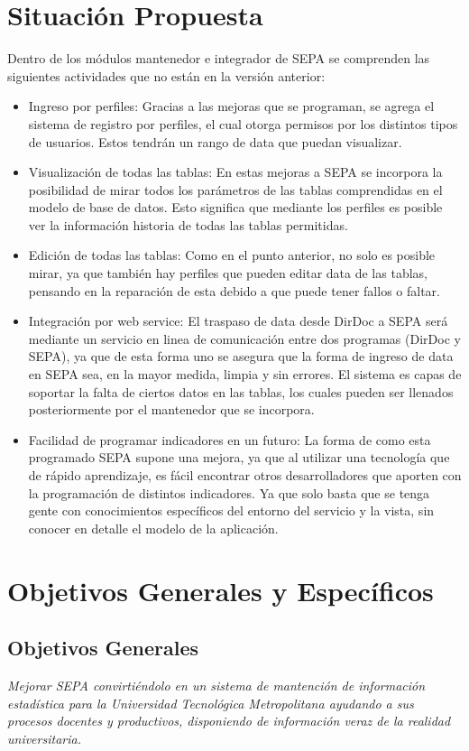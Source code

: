 \documentclass[a4paper,12pt,openany,oneside]{book}
\begin{document}
\section{Situación Propuesta}
Dentro de los módulos mantenedor e integrador de SEPA se comprenden las siguientes actividades que no están en la versión anterior:

\begin{itemize}
	\item Ingreso por perfiles: Gracias a las mejoras que se programan, se agrega el sistema de registro por perfiles, el cual otorga permisos por los distintos tipos de usuarios. Estos tendrán un rango de data que puedan visualizar. 
	\item Visualización de todas las tablas: En estas mejoras a SEPA se incorpora la posibilidad de mirar todos los parámetros de las tablas comprendidas en el modelo de base de datos. Esto significa que mediante los perfiles es posible ver la información historia de todas las tablas permitidas.
	\item Edición de todas las tablas: Como en el punto anterior, no solo es posible mirar, ya que también hay perfiles que pueden editar data de las tablas, pensando en la reparación de esta debido a que puede tener fallos o faltar.
	\item Integración por web service: El traspaso de data desde DirDoc a SEPA será mediante un servicio en linea de comunicación entre dos programas (DirDoc y SEPA), ya que de esta forma uno se asegura que la forma de ingreso de data en SEPA sea, en la mayor medida, limpia y sin errores. El sistema es capas de soportar la falta de ciertos datos en las tablas, los cuales pueden ser llenados posteriormente por el mantenedor que se incorpora.
	\item Facilidad de programar indicadores en un futuro: La forma de como esta programado SEPA supone una mejora, ya que al utilizar una tecnología que de rápido aprendizaje, es fácil encontrar otros desarrolladores que aporten con la programación de distintos indicadores. Ya que solo basta que se tenga gente con conocimientos específicos del entorno del servicio y la vista, sin conocer en detalle el modelo de la aplicación.
\end{itemize}
\section{Objetivos Generales y Específicos}
\subsection{Objetivos Generales}
\textit{Mejorar SEPA convirtiéndolo en un sistema de mantención de información estadística para la Universidad Tecnológica Metropolitana ayudando a sus procesos docentes y productivos, disponiendo de información veraz de la realidad universitaria.}
\end{document}
